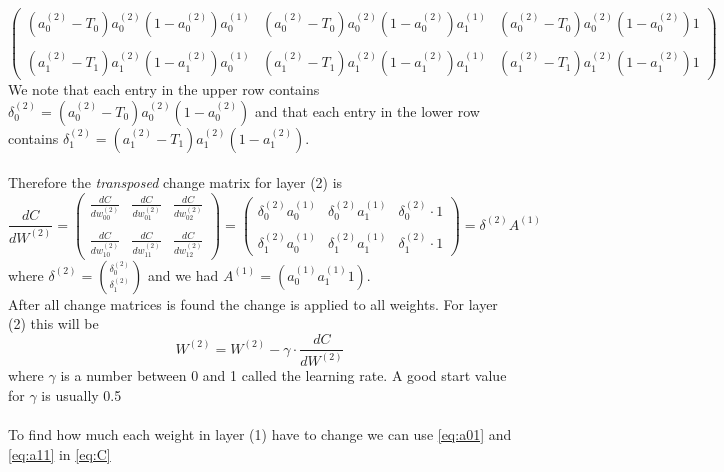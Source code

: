 \documentclass{article}
\begin{document}
$$\begin{pmatrix}
(a_0^{(2)}-T_0)a_0^{(2)}(1-a_0^{(2)})a_0^{(1)} & (a_0^{(2)}-T_0)a_0^{(2)}(1-a_0^{(2)})a_1^{(1)} & (a_0^{(2)}-T_0)a_0^{(2)}(1-a_0^{(2)})1
\\\\
(a_1^{(2)}-T_1)a_1^{(2)}(1-a_1^{(2)})a_0^{(1)} & (a_1^{(2)}-T_1)a_1^{(2)}(1-a_1^{(2)})a_1^{(1)} & (a_1^{(2)}-T_1)a_1^{(2)}(1-a_1^{(2)})1
\end{pmatrix}$$
We note that each entry in the upper row contains $\delta_0^{(2)} = (a_0^{(2)}-T_0)a_0^{(2)}(1-a_0^{(2)})$ and that each entry in the lower row contains $\delta_1^{(2)} = (a_1^{(2)}-T_1)a_1^{(2)}(1-a_1^{(2)})$.
\\
\\
Therefore the \textit{transposed} change matrix for layer (2) is $$\frac{dC}{dW^{(2)}} = 
\begin{pmatrix}
\frac{dC}{dw_{00}^{(2)}} & \frac{dC}{dw_{01}^{(2)}} & \frac{dC}{dw_{02}^{(2)}}
\\\\
\frac{dC}{dw_{10}^{(2)}} & \frac{dC}{dw_{11}^{(2)}} & \frac{dC}{dw_{12}^{(2)}} 
\end{pmatrix} = \begin{pmatrix}
\delta_0^{(2)}a_0^{(1)} & \delta_0^{(2)}a_1^{(1)} & \delta_0^{(2)} \cdot 1
\\\\
\delta_1^{(2)}a_0^{(1)} & \delta_1^{(2)}a_1^{(1)} & \delta_1^{(2)} \cdot 1
\end{pmatrix} = \delta^{(2)}A^{(1)}
$$
where $\delta^{(2)} = \binom{\delta_0^{(2)}}{\delta_1^{(2)}}$
and we had $A^{(1)} = (a_0^{(1)} a_1^{(1)} 1)$.
\\
After all change matrices is found the change is applied to all weights. For layer (2) this will be $$W^{(2)} = W^{(2)} - \gamma \cdot \frac{dC}{dW^{(2)}}$$
where $\gamma$ is a number between 0 and 1 called the learning rate. A good start value for $\gamma$ is usually 0.5
\\
\\
To find how much each weight in layer (1) have to change we can use \eqref{eq:a01} and \eqref{eq:a11} in \eqref{eq:C}
\end{document}
